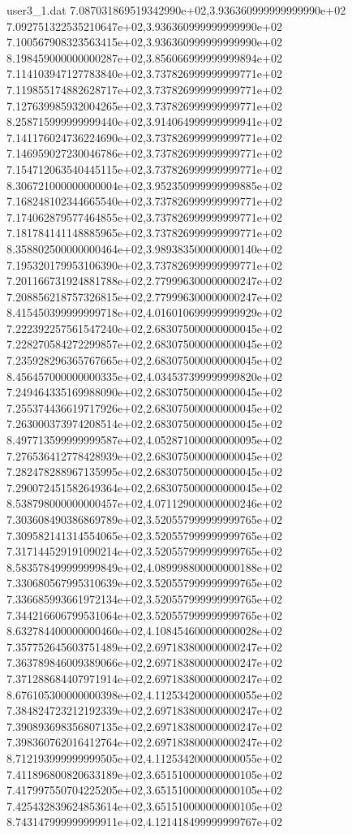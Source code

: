\begin{filecontents}{user3_1.dat}
7.087031869519342990e+02,3.936360999999999990e+02
7.092751322535210647e+02,3.936360999999999990e+02
7.100567908323563415e+02,3.936360999999999990e+02
8.198459000000000287e+02,3.856066999999999894e+02
7.114103947127783840e+02,3.737826999999999771e+02
7.119855174882628717e+02,3.737826999999999771e+02
7.127639985932004265e+02,3.737826999999999771e+02
8.258715999999999440e+02,3.914064999999999941e+02
7.141176024736224690e+02,3.737826999999999771e+02
7.146959027230046786e+02,3.737826999999999771e+02
7.154712063540445115e+02,3.737826999999999771e+02
8.306721000000000004e+02,3.952350999999999885e+02
7.168248102344665540e+02,3.737826999999999771e+02
7.174062879577464855e+02,3.737826999999999771e+02
7.181784141148885965e+02,3.737826999999999771e+02
8.358802500000000464e+02,3.989383500000000140e+02
7.195320179953106390e+02,3.737826999999999771e+02
7.201166731924881788e+02,2.779996300000000247e+02
7.208856218757326815e+02,2.779996300000000247e+02
8.415450399999999718e+02,4.016010699999999929e+02
7.222392257561547240e+02,2.683075000000000045e+02
7.228270584272299857e+02,2.683075000000000045e+02
7.235928296365767665e+02,2.683075000000000045e+02
8.456457000000000335e+02,4.034537399999999820e+02
7.249464335169988090e+02,2.683075000000000045e+02
7.255374436619717926e+02,2.683075000000000045e+02
7.263000373974208514e+02,2.683075000000000045e+02
8.497713599999999587e+02,4.052871000000000095e+02
7.276536412778428939e+02,2.683075000000000045e+02
7.282478288967135995e+02,2.683075000000000045e+02
7.290072451582649364e+02,2.683075000000000045e+02
8.538798000000000457e+02,4.071129000000000246e+02
7.303608490386869789e+02,3.520557999999999765e+02
7.309582141314554065e+02,3.520557999999999765e+02
7.317144529191090214e+02,3.520557999999999765e+02
8.583578499999999849e+02,4.089998800000000188e+02
7.330680567995310639e+02,3.520557999999999765e+02
7.336685993661972134e+02,3.520557999999999765e+02
7.344216606799531064e+02,3.520557999999999765e+02
8.632784400000000460e+02,4.108454600000000028e+02
7.357752645603751489e+02,2.697183800000000247e+02
7.363789846009389066e+02,2.697183800000000247e+02
7.371288684407971914e+02,2.697183800000000247e+02
8.676105300000000398e+02,4.112534200000000055e+02
7.384824723212192339e+02,2.697183800000000247e+02
7.390893698356807135e+02,2.697183800000000247e+02
7.398360762016412764e+02,2.697183800000000247e+02
8.712193999999999505e+02,4.112534200000000055e+02
7.411896800820633189e+02,3.651510000000000105e+02
7.417997550704225205e+02,3.651510000000000105e+02
7.425432839624853614e+02,3.651510000000000105e+02
8.743147999999999911e+02,4.121418499999999767e+02

\end{filecontents}
